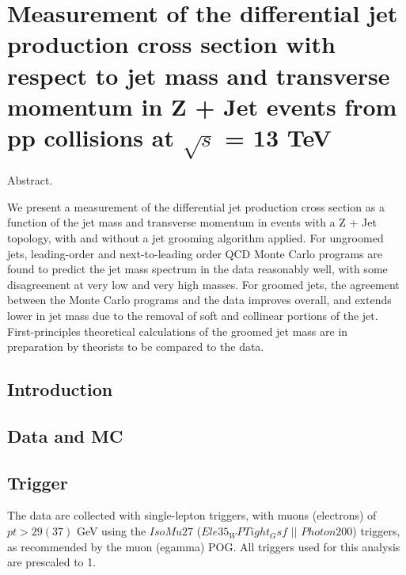 \chapter{Measurement of the differential jet production cross section with respect to jet mass and transverse momentum in
Z + Jet events from pp collisions at $\sqrt{s}$ = 13 TeV}\label{chap:AN-18-240}


%


Abstract.

We present a measurement of the differential jet production cross
section as a function of the jet mass and transverse momentum in
events with a Z + Jet topology, with and without a jet grooming
algorithm applied. For ungroomed jets, leading-order and next-to-leading order
QCD Monte Carlo programs are found to predict the jet mass
spectrum in the data reasonably well, with some disagreement
at very low and very high masses. 
For groomed jets, the agreement between the Monte Carlo programs and the data
improves overall, and extends lower in jet mass due to the removal of soft and
collinear portions of the jet. 
First-principles theoretical calculations of the groomed jet mass are in preparation by theorists to be compared
to the data. 






\section{Introduction}



\section{Data and MC}





\section{Trigger}

The data are collected with single-lepton triggers, with muons (electrons) of $pt > 29 (37)$ GeV using the $IsoMu27$ ($Ele35_WPTight_Gsf$ $ || $ $ Photon200 $) triggers, as recommended by the muon (egamma) POG. All triggers used for this analysis are prescaled to 1. 




